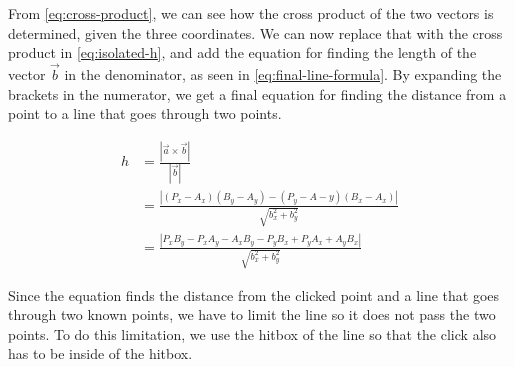 From \eqref{eq:cross-product}, we can see how the cross product of the two vectors is determined, given the three coordinates.
We can now replace that with the cross product in \eqref{eq:isolated-h}, and add the equation for finding the length of the vector $\vec{b}$ in the denominator, as seen in \eqref{eq:final-line-formula}.
By expanding the brackets in the numerator, we get a final equation for finding the distance from a point to a line that goes through two points.

\begin{equation}\label{eq:final-line-formula}
\begin{aligned}
	h &= \frac{|\vec{a} \times \vec{b}|}{|\vec{b}|}\\
	  &= \frac{|(P_x-A_x)(B_y-A_y)-(P_y-A-y)(B_x-A_x)|}{\sqrt{b_x^2+b_y^2}}\\
	  &= \frac{|P_xB_y-P_xA_y-A_xB_y-P_yB_x+P_yA_x+A_yB_x|}{\sqrt{b_x^2+b_y^2}}
\end{aligned}
\end{equation}

Since the equation finds the distance from the clicked point and a line that goes through two known points, we have to limit the line so it does not pass the two points.
To do this limitation, we use the hitbox of the line so that the click also has to be inside of the hitbox.

